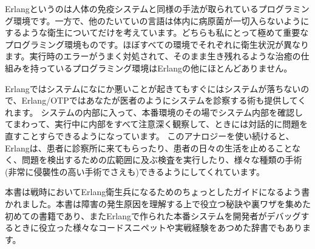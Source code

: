 Erlangというのは人体の免疫システムと同様の手法が取られているプログラミング環境です。一方で、他のたいていの言語は体内に病原菌が一切入らないようにするような衛生についてだけを考えています。どちらも私にとって極めて重要なプログラミング環境ものです。ほぼすべての環境でそれぞれに衛生状況が異なります。実行時のエラーがうまく対処されて、そのまま生き残れるような治癒の仕組みを持っているプログラミング環境はErlangの他にほとんどありません。

Erlangではシステムになにか悪いことが起きてもすぐにはシステムが落ちないので、Erlang/OTPではあなたが医者のようにシステムを診察する術も提供してくれます。
システムの内部に入って、本番環境のその場でシステム内部を確認してまわって、実行中に内部をすべて注意深く観察して、ときには対話的に問題を直すことすらできるようになっています。
このアナロジーを使い続けると、Erlangは、患者に診察所に来てもらったり、患者の日々の生活を止めることなく、問題を検出するための広範囲に及ぶ検査を実行したり、様々な種類の手術(非常に侵襲性の高い手術でさえも)できるようにしてくれています。

本書は戦時においてErlang衛生兵になるためのちょっとしたガイドになるよう書かれました。本書は障害の発生原因を理解する上で役立つ秘訣や裏ワザを集めた初めての書籍であり、またErlangで作られた本番システムを開発者がデバッグするときに役立った様々なコードスニペットや実戦経験をあつめた辞書でもあります。

